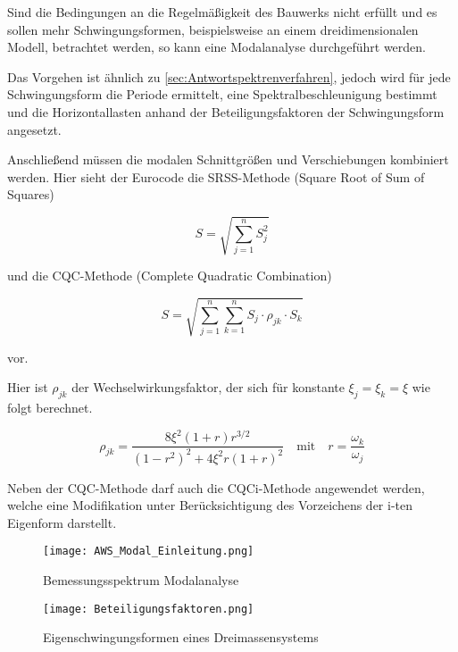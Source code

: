 Sind die Bedingungen an die Regelmäßigkeit des Bauwerks nicht erfüllt und es sollen mehr Schwingungsformen, beispielsweise an einem dreidimensionalen Modell, betrachtet werden, so kann eine Modalanalyse durchgeführt werden.

Das Vorgehen ist ähnlich zu \cref{sec:Antwortspektrenverfahren}, jedoch wird für jede Schwingungsform die Periode ermittelt, eine Spektralbeschleunigung bestimmt und die Horizontallasten anhand der Beteiligungsfaktoren der Schwingungsform angesetzt.

Anschließend müssen die modalen Schnittgrößen und Verschiebungen kombiniert werden. Hier sieht der Eurocode die SRSS-Methode (Square Root of Sum of Squares)

\begin{equation*}
S = \sqrt{\sum_{j=1}^{n}S_j^2}
\end{equation*}

und die CQC-Methode (Complete Quadratic Combination)

\begin{equation*}
S = \sqrt{\sum_{j=1}^{n}\sum_{k=1}^{n} S_j \cdot \rho_{jk} \cdot S_k}
\end{equation*}

vor.

\pagebreak

Hier ist $\rho_{jk}$ der Wechselwirkungsfaktor, der sich für konstante $\xi_j = \xi_k = \xi$ wie folgt berechnet.

\begin{equation*}
\rho_{jk} = \frac{8 \xi^2 (1 + r) r^{3/2}}{(1 - r^2)^2 + 4 \xi^2 r ( 1 + r)^2}
\quad\mathrm{mit}\quad 
r = \frac{\omega_k}{\omega_j}
\end{equation*}

Neben der CQC-Methode darf auch die CQCi-Methode angewendet werden, welche eine Modifikation unter Berücksichtigung des Vorzeichens der i-ten Eigenform darstellt.

\begin{figure}[h]
    \centering
    \texttt{[image: AWS\_Modal\_Einleitung.png]}
    \caption{Bemessungsspektrum Modalanalyse}
\end{figure}

\begin{figure}[h]
    \centering
    \texttt{[image: Beteiligungsfaktoren.png]}
    \caption{Eigenschwingungsformen eines Dreimassensystems \cite{Pocanschi}}
\end{figure}

\pagebreak

